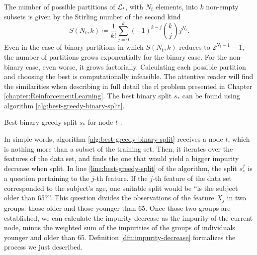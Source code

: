 The number of possible partitions of $\mathcal{L}_t$, with $N_t$ elements, into $k$
non-empty subsets is given by the Stirling number of the second kind
\cite{louppe2014}
\[
    S(N_t, k) \coloneqq \frac{1}{k!} \sum_{j=0}^{k} (-1)^{k-j} \binom{k}{j} j^{N_t}.
\]
Even in the case of binary partitions in which $S(N_t, k)$ reduces to $2^{N_t
-1}-1$, the number of partitions grows exponentially for the binary case. For
the non-binary case, even worse, it grows factorially. Calculating each possible
partition and choosing the best is computationally infeasible. The attentive
reader will find the similarities when describing in full detail the \ac{rl}
problem presented in Chapter \ref{chapter:ReinforcementLearning}. The best
binary split $s_*$ can be found using algorithm
\ref{alg:best-greedy-binary-split}.

\begin{algorithm}
    \caption[Best binary, greedy, split for node $t$.]{Best binary greedy split $s_*$ for node $t$ \cite[Ch.~3.6.3]{louppe2014}.}
    \label{alg:best-greedy-binary-split}
\end{algorithm}

In simple words, algorithm \ref{alg:best-greedy-binary-split} receives a node
$t$, which is nothing more than a subset of the training set. Then, it iterates
over the features of the data set, and finds the one that would yield a bigger
impurity decrease when split. In line \ref{line:best-greedy-split} of the
algorithm, the split $s_{*}^{j}$ is a question pertaining to the $j$-th feature.
If the $j$-th feature of the data set corresponded to the subject's age, one
suitable split would be ``is the subject older than 65?''. This question divides
the observations of the feature $X_j$ in two groups: those older and those
younger than 65. Once those two groups are established, we can calculate the
impurity decrease as the impurity of the current node, minus the weighted sum of
the impurities of the groups of individuals younger and older than 65.
Definition \ref{dfn:impurity-decrease} formalizes the process we just described.

